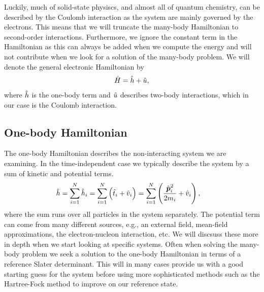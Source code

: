         Luckily, much of solid-state physiscs, and almost all of quantum
        chemistry, can be described by the Coulomb interaction as the system are
        mainly governed by the electrons.
        This means that we will truncate the many-body Hamiltonian to
        second-order interactions.
        Furthermore, we ignore the constant term in the Hamiltonian as this can
        always be added when we compute the energy and will not contribute when
        we look for a solution of the many-body problem.
        We will denote the general electronic Hamiltonian by
        \begin{align}
            \hat{H} = \hat{h} + \hat{u},
        \end{align}
        where $\hat{h}$ is the one-body term and $\hat{u}$ describes
        two-body interactions, which in our case is the Coulomb interaction.

        \subsection{One-body Hamiltonian}
            The one-body Hamiltonian describes the non-interacting system we are
            examining.
            In the time-independent case we typically describe the system by a
            sum of kinetic and potential terms.
            \begin{align}
                \hat{h}
                &= \sum_{i = 1}^{N}\hat{h}_i
                = \sum_{i = 1}^{N}\left( 
                    \hat{t}_i + \hat{v}_i
                 \right)
                = \sum_{i = 1}^{N}\left( 
                    \frac{\hat{\boldsymbol{p}}^2_i}{2m_i} + \hat{v}_i
                 \right),
            \end{align}
            where the sum runs over all particles in the system separately.
            The potential term can come from many different sources, e.g., an
            external field, mean-field approximations, the electron-nucleon
            interaction, etc.
            We will discsuss these more in depth when we start looking at
            specific systems.
            Often when solving the many-body problem we seek a solution to the
            one-body Hamiltonian in terms of a reference Slater determinant.
            This will in many cases provide us with a good starting guess for
            the system before using more sophisticated methods such as the
            Hartree-Fock method to improve on our reference state.

